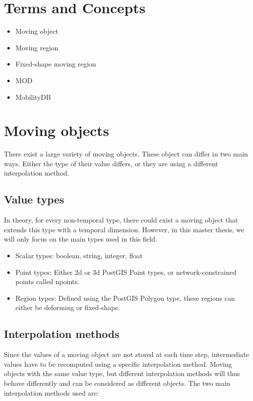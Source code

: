 \section{Terms and Concepts}



\begin{itemize}
	\item Moving object
	\item Moving region
	\item Fixed-shape moving region
	\item MOD
	\item MobilityDB
\end{itemize}

\section{Moving objects}

There exist a large variety of moving objects. These object can differ in two main ways. Either the type of their value differs, or they are using a different interpolation method.

	\subsection{Value types}

	In theory, for every non-temporal type, there could exist a moving object that extends this type with a temporal dimension. However, in this master thesis, we will only focus on the main types used in this field.

	\begin{itemize}
		\item Scalar types: boolean, string, integer, float
		\item Point types: Either 2d or 3d PostGIS Point types, or network-constrained points called npoints.
		\item Region types: Defined using the PostGIS Polygon type, these regions can either be deforming or fixed-shape.
	\end{itemize}

	\subsection{Interpolation methods}

	Since the values of a moving object are not stored at each time step, intermediate values have to be recomputed using a specific interpolation method. Moving objects with the same value type, but different interpolation methods will thus behave differently and can be considered as different objects. The two main interpolation methods used are:

